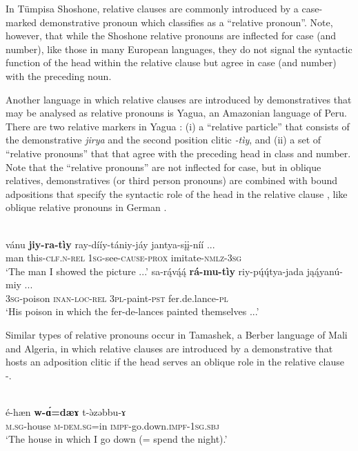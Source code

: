 \documentclass[output=paper,colorlinks,citecolor=brown]{langscibook}
\begin{document}
In Tümpisa Shoshone, relative clauses are commonly introduced by a case-marked demonstrative pronoun which \citet[357]{Dayley1989} classifies as a “relative pronoun”. Note, however, that while the Shoshone relative pronouns are inflected for case (and number), like those in many European languages, they do not signal the syntactic function of the head within the relative clause but agree in case (and number) with the preceding noun.

Another language in which relative clauses are introduced by demonstratives that may be analysed as relative pronouns is Yagua, an Amazonian language of Peru. There are two relative markers in Yagua  \citep[342-346]{PaynePayne1990}: (i) a “relative particle” that consists of the demonstrative \textit{jirya} and the second position clitic \textit{-tìy}, and (ii) a set of “relative pronouns” that that agree with the preceding head in class and number. Note that the “relative pronouns” are not inflected for case, but in oblique relatives, demonstratives (or third person pronouns) are combined with bound adpositions that specify the syntactic role of the head in the relative clause , like oblique relative pronouns in German .

\ea\label{ex:diessel:3}
\\
\ea\label{ex:diessel:3a}
\gll   vánu  {\ob}\textbf{jiy-ra-tìy} ray-dííy-tániy-jáy   jantya-sįį-níí{\cb}  ...\\
       man  {\db}this-\textsc{clf.n-rel} \textsc{1sg}-see-\textsc{cause-prox} imitate-\textsc{nmlz-3sg}\\
\glt ‘The man I showed the picture ...’
\ex\label{ex:diessel:3b}
\gll   sa-rą́vą́ą́   {\ob}\textbf{rá-mu-tìy}  riy-pų́ų́tya-jada  jąą́yanú-miy{\cb}  ...\\
       \textsc{3sg}-poison {\db}\textsc{inan-loc-rel}  \textsc{3pl}-paint-\textsc{pst} fer.de.lance-\textsc{pl}\\
\glt ‘His poison in which the fer-de-lances painted themselves ...’
\z
\z

Similar types of relative pronouns occur in Tamashek, a Berber language of Mali and Algeria, in which relative clauses are introduced by a demonstrative that hosts an adposition clitic if the head serves an oblique role in the relative clause -.

\ea\label{ex:diessel:4}
\\
\ea\label{ex:diessel:4a}
\gll   é-hæn    {\ob}\textbf{w-\'ɑ=dæɤ}  t-\`əzəbbu-ɤ{\cb}\\
       \textsc{m.sg-}house  {\db}\textsc{m-dem.sg=}in  \textsc{impf-}go.down\textsc{.impf-1sg.sbj}\\
\glt ‘The house in which I go down (= spend the night).’
\end{document}

